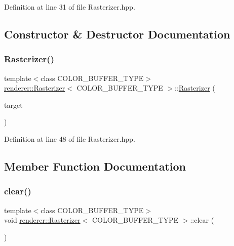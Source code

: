 Definition at line 31 of file Rasterizer.\+hpp.



\subsection{Constructor \& Destructor Documentation}
\mbox{\label{classrenderer_1_1_rasterizer_ac5e189bc1da9bf01482e1a68675f9ce0}} 
\subsubsection{\texorpdfstring{Rasterizer()}{Rasterizer()}}
{\footnotesize\ttfamily template$<$class C\+O\+L\+O\+R\+\_\+\+B\+U\+F\+F\+E\+R\+\_\+\+T\+Y\+PE$>$ \\
\mbox{\hyperlink{classrenderer_1_1_rasterizer}{renderer\+::\+Rasterizer}}$<$ C\+O\+L\+O\+R\+\_\+\+B\+U\+F\+F\+E\+R\+\_\+\+T\+Y\+PE $>$\+::\mbox{\hyperlink{classrenderer_1_1_rasterizer}{Rasterizer}} (\begin{DoxyParamCaption}\item[{\mbox{\hyperlink{classrenderer_1_1_rasterizer_a1568956faf65b03116e04b4cb0213770}{Color\+\_\+\+Buffer}} \&}]{target }\end{DoxyParamCaption})\hspace{0.3cm}{\ttfamily [inline]}}



Definition at line 48 of file Rasterizer.\+hpp.



\subsection{Member Function Documentation}
\mbox{\label{classrenderer_1_1_rasterizer_a3b3bb924be67b6876427deacd6c7fe2c}} 
\subsubsection{\texorpdfstring{clear()}{clear()}}
{\footnotesize\ttfamily template$<$class C\+O\+L\+O\+R\+\_\+\+B\+U\+F\+F\+E\+R\+\_\+\+T\+Y\+PE$>$ \\
void \mbox{\hyperlink{classrenderer_1_1_rasterizer}{renderer\+::\+Rasterizer}}$<$ C\+O\+L\+O\+R\+\_\+\+B\+U\+F\+F\+E\+R\+\_\+\+T\+Y\+PE $>$\+::clear (\begin{DoxyParamCaption}{ }\end{DoxyParamCaption})\hspace{0.3cm}{\ttfamily [inline]}}



